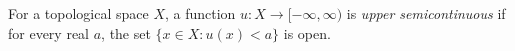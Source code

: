 
For a topological space $X$, a function $u:X\to[-\infty,\infty)$ is \emph{upper semicontinuous} if for every real $a$, the set $\{x\in X:u(x)<a\}$ is open.
